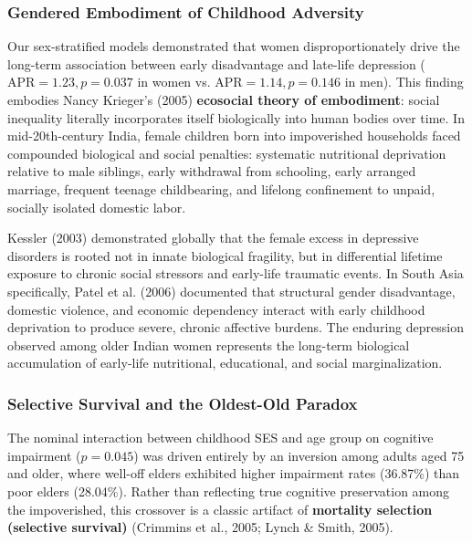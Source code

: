 \subsubsection{Gendered Embodiment of Childhood Adversity}
Our sex-stratified models demonstrated that women disproportionately drive the long-term association between early disadvantage and late-life depression ($\text{APR} = 1.23, p = 0.037$ in women vs. $\text{APR} = 1.14, p = 0.146$ in men). This finding embodies Nancy Krieger's (2005) \textbf{ecosocial theory of embodiment}: social inequality literally incorporates itself biologically into human bodies over time. In mid-20th-century India, female children born into impoverished households faced compounded biological and social penalties: systematic nutritional deprivation relative to male siblings, early withdrawal from schooling, early arranged marriage, frequent teenage childbearing, and lifelong confinement to unpaid, socially isolated domestic labor.

Kessler (2003) demonstrated globally that the female excess in depressive disorders is rooted not in innate biological fragility, but in differential lifetime exposure to chronic social stressors and early-life traumatic events. In South Asia specifically, Patel et al. (2006) documented that structural gender disadvantage, domestic violence, and economic dependency interact with early childhood deprivation to produce severe, chronic affective burdens. The enduring depression observed among older Indian women represents the long-term biological accumulation of early-life nutritional, educational, and social marginalization.

\subsubsection{Selective Survival and the Oldest-Old Paradox}
The nominal interaction between childhood SES and age group on cognitive impairment ($p = 0.045$) was driven entirely by an inversion among adults aged 75 and older, where well-off elders exhibited higher impairment rates (36.87\%) than poor elders (28.04\%). Rather than reflecting true cognitive preservation among the impoverished, this crossover is a classic artifact of \textbf{mortality selection (selective survival)} (Crimmins et al., 2005; Lynch \& Smith, 2005).

